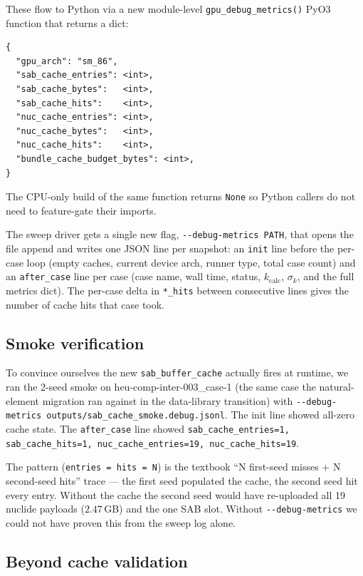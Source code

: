 These flow to Python via a new module-level
\texttt{gpu\_debug\_metrics()} PyO3 function that returns a dict:

\begin{verbatim}
{
  "gpu_arch": "sm_86",
  "sab_cache_entries": <int>,
  "sab_cache_bytes":   <int>,
  "sab_cache_hits":    <int>,
  "nuc_cache_entries": <int>,
  "nuc_cache_bytes":   <int>,
  "nuc_cache_hits":    <int>,
  "bundle_cache_budget_bytes": <int>,
}
\end{verbatim}

The CPU-only build of the same function returns \texttt{None} so
Python callers do not need to feature-gate their imports.

The sweep driver gets a single new flag,
\texttt{-{}-debug-metrics PATH}, that opens the file append and
writes one JSON line per snapshot: an \texttt{init} line before
the per-case loop (empty caches, current device arch, runner
type, total case count) and an \texttt{after\_case} line per
case (case name, wall time, status, $k_\text{calc}$, $\sigma_k$,
and the full metrics dict). The per-case delta in
\texttt{*\_hits} between consecutive lines gives the number of
cache hits that case took.

\subsection{Smoke verification}

To convince ourselves the new \texttt{sab\_buffer\_cache} actually
fires at runtime, we ran the 2-seed smoke on
heu-comp-inter-003\_case-1 (the same case the natural-element
migration ran against in the data-library transition) with
\texttt{-{}-debug-metrics outputs/sab\_cache\_smoke.debug.jsonl}.
The init line showed all-zero cache state. The
\texttt{after\_case} line showed
\texttt{sab\_cache\_entries=1, sab\_cache\_hits=1,
nuc\_cache\_entries=19, nuc\_cache\_hits=19}.

The pattern (\texttt{entries = hits = N}) is the textbook ``N
first-seed misses + N second-seed hits'' trace --- the first seed
populated the cache, the second seed hit every entry. Without the
cache the second seed would have re-uploaded all 19 nuclide
payloads ($2.47\,$GB) and the one SAB slot. Without
\texttt{-{}-debug-metrics} we could not have proven this from the
sweep log alone.

\subsection{Beyond cache validation}


